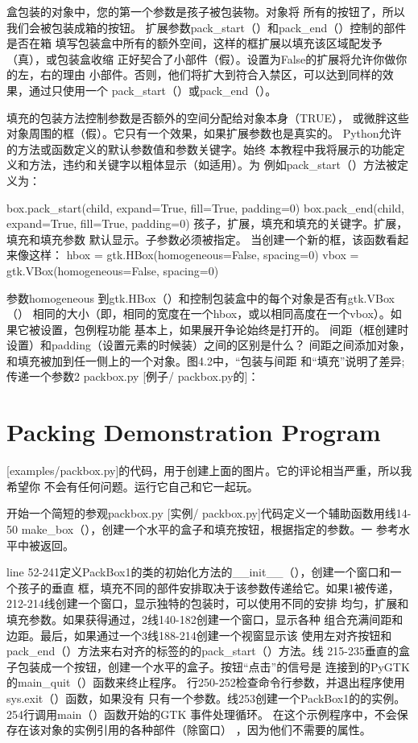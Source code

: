 盒包装的对象中，您的第一个参数是孩子被包装物。对象将
所有的按钮了，所以我们会被包装成箱的按钮。
扩展参数pack_start（）和pack_end（）控制的部件是否在箱
填写包装盒中所有的额外空间，这样的框扩展以填充该区域配发予（真），或包装盒收缩
正好契合了小部件（假）。设置为False的扩展将允许你做你的左，右的理由
小部件。否则，他们将扩大到符合入禁区，可以达到同样的效果，通过只使用一个
pack_start（）或pack_end（）。

填充的包装方法控制参数是否额外的空间分配给对象本身（TRUE），
或微胖这些对象周围的框（假）。它只有一个效果，如果扩展参数也是真实的。
Python允许的方法或函数定义的默认参数值和参数关键字。始终
本教程中我将展示的功能定义和方法，违约和关键字以粗体显示（如适用）。为
例如pack_start（）方法被定义为：

box.pack_start(child, expand=True, fill=True, padding=0)
box.pack_end(child, expand=True, fill=True, padding=0)
孩子，扩展，填充和填充的关键字。扩展，填充和填充参数
默认显示。子参数必须被指定。
当创建一个新的框，该函数看起来像这样：
hbox = gtk.HBox(homogeneous=False, spacing=0)
vbox = gtk.VBox(homogeneous=False, spacing=0)

参数homogeneous 到gtk.HBox（）和控制包装盒中的每个对象是否有gtk.VBox（）
相同的大小（即，相同的宽度在一个hbox，或以相同高度在一个vbox）。如果它被设置，包例程功能
基本上，如果展开争论始终是打开的。
间距（框创建时设置）和padding（设置元素的时候装）之间的区别是什么？
间距之间添加对象，和填充被加到任一侧上的一个对象。图4.2中，“包装与间距
和“填充”说明了差异;传递一个参数2 packbox.py [例子/ packbox.py的]：
\section{Packing Demonstration Program}
[examples/packbox.py]的代码，用于创建上面的图片。它的评论相当严重，所以我希望你
不会有任何问题。运行它自己和它一起玩。

开始一个简短的参观packbox.py [实例/ packbox.py]代码定义一个辅助函数用线14-50
make_box（），创建一个水平的盒子和填充按钮，根据指定的参数。一
参考水平中被返回。	


line 52-241定义PackBox1的类的初始化方法的__init__（），创建一个窗口和一个孩子的垂直
框，填充不同的部件安排取决于该参数传递给它。如果1被传递，
212-214线创建一个窗口，显示独特的包装时，可以使用不同的安排
均匀，扩展和填充参数。如果获得通过，2线140-182创建一个窗口，显示各种
组合充满间距和边距。最后，如​​果通过一个3线188-214创建一个视窗显示该
使用左对齐按钮和pack_end（）方法来右对齐的标签的的pack_start（）方法。线
215-235垂直的盒子包装成一个按钮，创建一个水平的盒子。按钮“点击”的信号是
连接到的PyGTK的main_quit（）函数来终止程序。
行250-252检查命令行参数，并退出程序使用sys.exit（）函数，如果没有
只有一个参数。线253创建一个PackBox1的的实例。 254行调用main（）函数开始的GTK
事件处理循环。
在这个示例程序中，不会保存在该对象的实例引用的各种部件（除窗口）
，因为他们不需要的属性。

